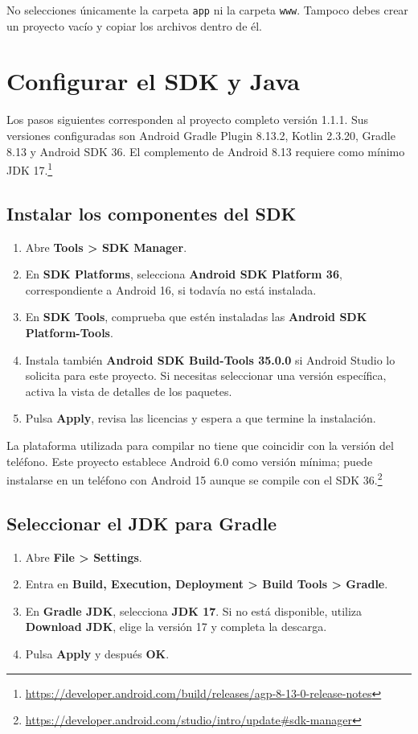 \documentclass[12pt,a4paper]{article}
\begin{document}
No selecciones únicamente la carpeta \texttt{app} ni la carpeta \texttt{www}. Tampoco debes crear un proyecto vacío y copiar los archivos dentro de él.

\section{Configurar el SDK y Java}

Los pasos siguientes corresponden al proyecto completo versión 1.1.1. Sus versiones configuradas son Android Gradle Plugin 8.13.2, Kotlin 2.3.20, Gradle 8.13 y Android SDK 36. El complemento de Android 8.13 requiere como mínimo JDK 17.\footnote{\url{https://developer.android.com/build/releases/agp-8-13-0-release-notes}}

\subsection{Instalar los componentes del SDK}

\begin{enumerate}
    \item Abre \textbf{Tools > SDK Manager}.
    \item En \textbf{SDK Platforms}, selecciona \textbf{Android SDK Platform 36}, correspondiente a Android 16, si todavía no está instalada.
    \item En \textbf{SDK Tools}, comprueba que estén instaladas las \textbf{Android SDK Platform-Tools}.
    \item Instala también \textbf{Android SDK Build-Tools 35.0.0} si Android Studio lo solicita para este proyecto. Si necesitas seleccionar una versión específica, activa la vista de detalles de los paquetes.
    \item Pulsa \textbf{Apply}, revisa las licencias y espera a que termine la instalación.
\end{enumerate}

La plataforma utilizada para compilar no tiene que coincidir con la versión del teléfono. Este proyecto establece Android 6.0 como versión mínima; puede instalarse en un teléfono con Android 15 aunque se compile con el SDK 36.\footnote{\url{https://developer.android.com/studio/intro/update#sdk-manager}}

\subsection{Seleccionar el JDK para Gradle}

\begin{enumerate}
    \item Abre \textbf{File > Settings}.
    \item Entra en \textbf{Build, Execution, Deployment > Build Tools > Gradle}.
    \item En \textbf{Gradle JDK}, selecciona \textbf{JDK 17}. Si no está disponible, utiliza \textbf{Download JDK}, elige la versión 17 y completa la descarga.
    \item Pulsa \textbf{Apply} y después \textbf{OK}.
\end{enumerate}
\end{document}
